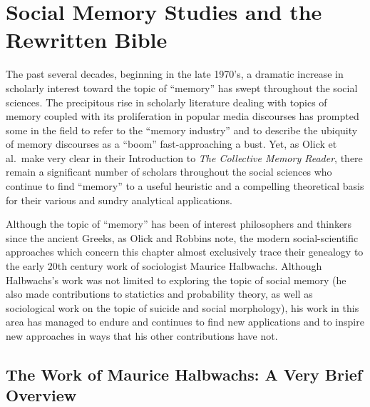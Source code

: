 \hypertarget{social-memory-studies-and-the-rwb}{%
\chapter{Social Memory Studies and the
Rewritten Bible}\label{social-memory-studies-and-the-rwb}}

The past several decades, beginning in the late 1970's, a dramatic
increase in scholarly interest toward the topic of ``memory'' has swept
throughout the social sciences. The precipitous rise in scholarly
literature dealing with topics of memory coupled with its proliferation
in popular media discourses has prompted some in the field to refer to
the ``memory industry'' and to describe the ubiquity of memory
discourses as a ``boom'' fast-approaching a
bust.\autocites{rosenfeld_jmh2009}{winter2006}{berliner_aq2005}{confino_ahr1997}
Yet, as Olick et al.~make very clear in their Introduction to \emph{The
Collective Memory Reader}, there remain a significant number of scholars
throughout the social sciences who continue to find ``memory'' to a
useful heuristic and a compelling theoretical basis for their various
and sundry analytical applications.\autocite[3--6]{olick_olick-etal2011}

Although the topic of ``memory'' has been of interest philosophers and
thinkers since the ancient Greeks, as Olick and Robbins note, the modern
social-scientific approaches which concern this chapter almost
exclusively trace their genealogy to the early 20th century work of
sociologist Maurice Halbwachs.\autocites[106]{olick-robbins_ars1998}[It
should be noted, however, that Halbwachs was not the first or only
person to do work on memory or the impact of society thereon, despite
most recent literature's preoccupation with him,
see][8--36]{olick_olick-etal2011} Although Halbwachs's work was not
limited to exploring the topic of social memory (he also made
contributions to statictics and probability theory, as well as
sociological work on the topic of suicide and social
morphology\autocite[13--20]{coser_halbwachs1992}), his work in this area
has managed to endure and continues to find new applications and to
inspire new approaches in ways that his other contributions have not.

\hypertarget{the-work-of-halbwachs-a-very-brief-overview}{%
\section{The Work of Maurice Halbwachs: A Very Brief
Overview}\label{the-work-of-halbwachs-a-very-brief-overview}}

